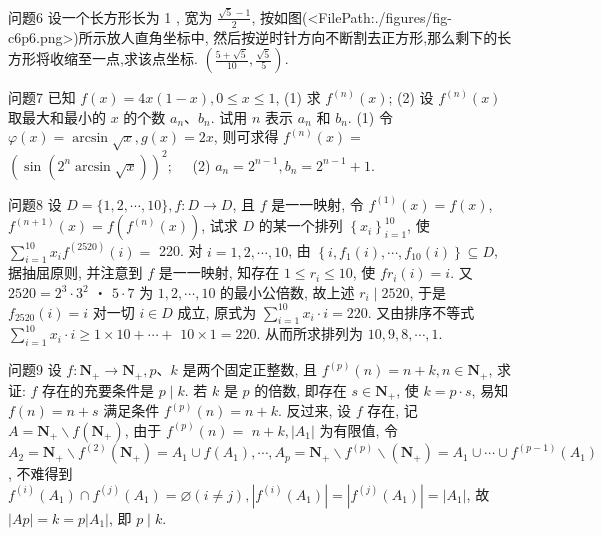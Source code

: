 问题6 设一个长方形长为 1 , 宽为 $\frac{\sqrt{5}-1}{2}$, 按如图(<FilePath:./figures/fig-c6p6.png>)所示放人直角坐标中, 然后按逆时针方向不断割去正方形,那么剩下的长方形将收缩至一点,求该点坐标.
$\left(\frac{5+\sqrt{5}}{10}, \frac{\sqrt{5}}{5}\right)$.



问题7 已知 $f(x)=4 x(1-x), 0 \leqslant x \leqslant 1$,
(1) 求 $f^{(n)}(x)$;
(2) 设 $f^{(n)}(x)$ 取最大和最小的 $x$ 的个数 $a_n 、 b_n$. 试用 $n$ 表示 $a_n$ 和 $b_n$.
(1) 令 $\varphi(x)=\arcsin \sqrt{x}, g(x)=2 x$, 则可求得 $f^{(n)}(x)=$ $\left(\sin \left(2^n \arcsin \sqrt{x}\right)\right)^2 ; \quad$ (2) $a_n=2^{n-1}, b_n=2^{n-1}+1$.



问题8 设 $D=\{1,2, \cdots, 10\}, f: D \rightarrow D$, 且 $f$ 是一一映射, 令 $f^{(1)}(x)=f(x)$, $f^{(n+1)}(x)=f\left(f^{(n)}(x)\right)$, 试求 $D$ 的某一个排列 $\left\{x_i\right\}_{i=1}^{10}$, 使 $\sum_{i=1}^{10} x_i f^{(2520)}(i)=$ 220.
对 $i=1,2, \cdots, 10$, 由 $\left\{i, f_1(i), \cdots, f_{10}(i)\right\} \subseteq D$, 据抽屈原则, 并注意到 $f$ 是一一映射, 知存在 $1 \leqslant r_i \leqslant 10$, 使 $f r_i(i)=i$. 又 $2520=2^3 \cdot 3^2$ ・ $5 \cdot 7$ 为 $1,2, \cdots, 10$ 的最小公倍数, 故上述 $r_i \mid 2520$, 于是 $f_{2520}(i)=i$ 对一切 $i \in D$ 成立, 原式为 $\sum_{i=1}^{10} x_i \cdot i=220$. 又由排序不等式 $\sum_{i=1}^{10} x_i \cdot i \geqslant 1 \times 10+\cdots+$ $10 \times 1=220$. 从而所求排列为 $10,9,8, \cdots, 1$.



问题9 设 $f: \mathbf{N}_{+} \rightarrow \mathbf{N}_{+}, p 、 k$ 是两个固定正整数, 且 $f^{(p)}(n)=n+k, n \in \mathbf{N}_{+}$, 求证: $f$ 存在的充要条件是 $p \mid k$.
若 $k$ 是 $p$ 的倍数, 即存在 $s \in \mathbf{N}_{+}$, 使 $k=p \cdot s$, 易知 $f(n)=n+s$ 满足条件 $f^{(p)}(n)=n+k$. 反过来, 设 $f$ 存在, 记 $A=\mathbf{N}_{+} \backslash f\left(\mathbf{N}_{+}\right)$, 由于 $f^{(p)}(n)=$ $n+k,\left|A_1\right|$ 为有限值, 令 $A_2=\mathbf{N}_{+} \backslash f^{(2)}\left(\mathbf{N}_{+}\right)=A_1 \cup f\left(A_1\right), \cdots, A_p= \mathbf{N}_{+} \backslash f^{(p)} \backslash\left(\mathbf{N}_{+}\right)=A_1 \cup \cdots \cup f^{(p-1)}\left(A_1\right)$, 不难得到 $f^{(i)}\left(A_1\right) \cap f^{(j)}\left(A_1\right)=\varnothing (i \neq j),\left|f^{(i)}\left(A_1\right)\right|=\left|f^{(j)}\left(A_1\right)\right|=\left|A_1\right|$, 故 $|A p|=k=p\left|A_1\right|$, 即 $p \mid k$.


